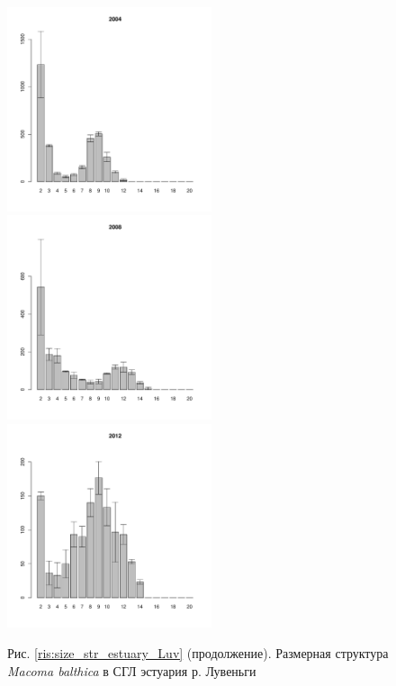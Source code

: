 \begin{figure}[hp]
	\begin{minipage}[b]{.3\linewidth}
	\begin{center}
	\includegraphics[width=60mm]{../White_Sea/Estuatiy_Luvenga/sizestr2_2004_.pdf}
	\end{center}
	\end{minipage}
	\hfill
	\begin{minipage}[b]{.3\linewidth}
	\begin{center}
	\includegraphics[width=60mm]{../White_Sea/Estuatiy_Luvenga/sizestr2_2008_.pdf}
	\end{center}
	\end{minipage}
	\hfill
	\begin{minipage}[b]{.3\linewidth}
	\begin{center}
	\includegraphics[width=60mm]{../White_Sea/Estuatiy_Luvenga/sizestr2_2012_.pdf}
	\end{center}
	\end{minipage}
	\begin{center}
	Рис. \ref{ris:size_str_estuary_Luv} (продолжение). Размерная структура {\it Macoma balthica} в СГЛ эстуария р. Лувеньги
	\end{center}
	\end{figure}


